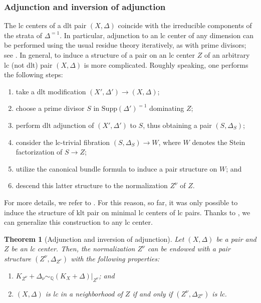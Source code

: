 \documentclass{amsart}
\newtheorem{theorem}{Theorem}[section]
\theoremstyle{definition}
\theoremstyle{remark}
\numberwithin{equation}{section}
\begin{document}
\subsubsection{Adjunction and inversion of adjunction}
The lc centers of a dlt pair $(X,\Delta)$ coincide with the irreducible components of the strata of $\Delta^{=1}$.
In particular, adjunction to an lc center of any dimension can be performed using the usual residue theory iteratively, as with prime divisors;
see \cite[\S 4.2]{kol13}.
In general, to induce a structure of a pair on an lc center $Z$ of an arbitrary lc (not dlt) pair $(X, \Delta)$ is more complicated.
Roughly speaking, one performs the following steps:
\begin{enumerate}
    \item take a dlt modification $(X',\Delta') \to (X,\Delta)$;
    \item choose a prime divisor $S$ in $\mathrm{Supp}(\Delta')^{=1}$ dominating $Z$;
    \item perform dlt adjunction of $(X',\Delta')$ to $S$, thus obtaining a pair $(S,\Delta_S)$;
    \item consider the lc-trivial fibration $(S,\Delta_S) \to W$, where $W$ denotes the Stein factorization of $S \to Z$;
    \item utilize the canonical bundle formula to induce a pair structure on $W$; and
    \item descend this latter structure to the normalization $Z^{\nu}$ of $Z$.
\end{enumerate}
For more details, we refer to \cite[\S 4]{FG2012}.
For this reason, so far, it was only possible to induce the structure of klt pair on minimal lc centers of lc pairs. Thanks to , we can generalize this construction to any lc center.

\begin{theorem}[Adjunction and inversion of adjunction]
\label{adj_inv_adj}
    Let $(X,\Delta)$ be a pair and $Z$ be an lc center.
    Then, the normalization $Z^{\nu}$ can be endowed with a pair structure $(Z^{\nu},\Delta_{Z^{\nu}})$ with the following properties:
    \begin{enumerate}
        \item\label{crepant condition} $K_{Z^{\nu}}+\Delta_{\nu} \sim_{\mathbb Q} (K_X+\Delta)|_{Z^{\nu}}$; and
        \item\label{inv_of_adj} $(X,\Delta)$ is lc in a neighborhood of $Z$ if and only if $(Z^{\nu},\Delta_{Z^{\nu}})$ is lc.
    \end{enumerate}
\end{theorem}
\end{document}
